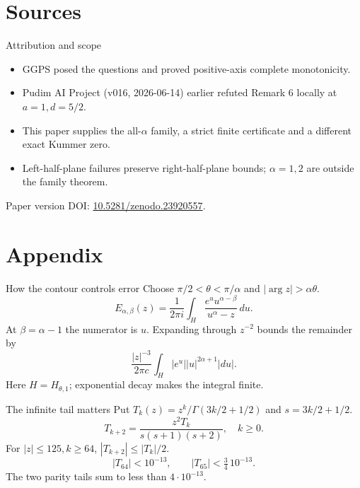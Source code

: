 \documentclass{beamer}
\begin{document}
\section{Sources}
\begin{frame}{Attribution and scope}
\begin{itemize}
\item GGPS posed the questions and proved positive-axis complete monotonicity.
\item Pudim AI Project (v016, 2026-06-14) earlier refuted Remark 6 locally at $a=1,d=5/2$.
\item This paper supplies the all-$\alpha$ family, a strict finite certificate and a different exact Kummer zero.
\item Left-half-plane failures preserve right-half-plane bounds; $\alpha=1,2$ are outside the family theorem.
\end{itemize}
\small Paper version DOI: \href{https://doi.org/10.5281/zenodo.23920557}{10.5281/zenodo.23920557}.
\end{frame}
\appendix
\section{Appendix}
\begin{frame}{How the contour controls error}
Choose $\pi/2{<} \theta{<} \pi/\alpha$ and $|\arg z|>\alpha\theta$.
\[
E_{\alpha,\beta}(z)=\frac1{2\pi i}\int_H\frac{e^u u^{\alpha-\beta}}{u^\alpha-z}\,du.
\]
At $\beta=\alpha-1$ the numerator is $u$. Expanding through $z^{-2}$ bounds the remainder by
\[
\frac{|z|^{-3}}{2\pi c}\int_H|e^u||u|^{2\alpha+1}|du|.
\]
Here $H=H_{\theta,1}$; exponential decay makes the integral finite.
\end{frame}
\begin{frame}{The infinite tail matters}
Put $T_k(z)=z^k/\Gamma(3k/2+1/2)$ and $s=3k/2+1/2$.
\[
T_{k+2}=\frac{z^2T_k}{s(s+1)(s+2)},\quad k\ge0.
\]
For $|z|\le125,k\ge64$, $|T_{k+2}|\le|T_k|/2$.
\[
|T_{64}|{<} 10^{-13},\qquad |T_{65}|{<} \tfrac34\,10^{-13}.
\]
The two parity tails sum to less than $4\cdot10^{-13}$.
\end{frame}
\FormalVerification
\end{document}
